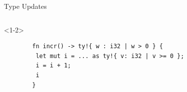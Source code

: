\documentclass{sdqbeamer}
\begin{document}
\begin{frame}[fragile]{Type Updates}
  \begin{columns}
    \begin{onlyenv}<1-2>
      \begin{verbatim}
        fn incr() -> ty!{ w : i32 | w > 0 } {
         let mut i = ... as ty!{ v: i32 | v >= 0 };
         i = i + 1;
         i
        }
      \end{verbatim}
    \end{onlyenv}


\end{columns}
\end{frame}
\end{document}
